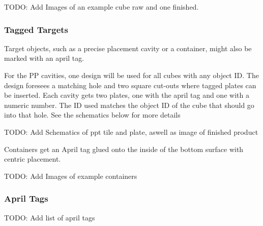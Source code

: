 TODO: Add Images of an example cube raw and one finished.


\subsubsection{Tagged Targets}

Target objects, such as a precise placement cavity or a container, might also be marked with an april tag.

For the PP cavities, one design will be used for all cubes with any object ID. 
The design foresees a matching hole and two square cut-outs where tagged plates can be inserted.
Each cavity gets two plates, one with the april tag and one with a numeric number.
The ID used matches the object ID of the cube that should go into that hole.
See the schematics below for more details

TODO: Add Schematics of ppt tile and plate, aswell as image of finished product


Containers get an April tag glued onto the inside of the bottom surface with centric placement.

TODO: Add Images of example containers


\subsubsection{April Tags}

TODO: Add list of april tags











